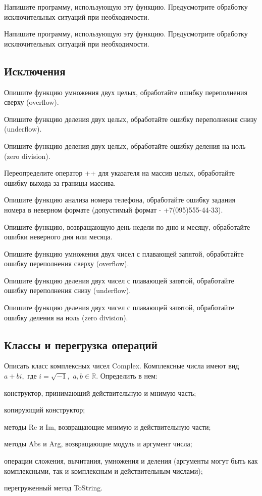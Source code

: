 \task %

Напишите программу, использующую эту функцию. Предусмотрите обработку
исключительных ситуаций при необходимости.

\task 

Напишите программу, использующую эту функцию. Предусмотрите обработку
исключительных ситуаций при необходимости.


\subsection{Исключения}

\task Опишите функцию умножения двух целых, обработайте ошибку переполнения сверху (overflow).

\task Опишите функцию деления двух целых, обработайте ошибку переполнения снизу (underflow).

\task Опишите функцию деления двух целых, обработайте ошибку деления на ноль (zero division).

\task Переопределите оператор ++ для указателя на массив целых, обработайте ошибку выхода за границы массива.

\task Опишите функцию анализа номера телефона, обработайте ошибку задания номера в неверном формате (допустимый формат - +7(095)555-44-33).

\task 

\task Опишите функцию, возвращающую день недели по дню и месяцу, обработайте ошибки неверного дня или месяца.

\task Опишите функцию умножения двух чисел с плавающей запятой, обработайте ошибку переполнения сверху (overflow).

\task Опишите функцию деления двух чисел с плавающей запятой, обработайте ошибку переполнения снизу (underflow).

\task Опишите функцию деления двух чисел с плавающей запятой, обработайте ошибку деления на ноль (zero division).


\subsection{Классы и перегрузка операций}

\task Описать класс комплексных чисел Complex. Комплексные числа имеют
вид $a+bi,$ где $i=\sqrt{-1},$ $a,b \in \mathbb{R}$. Определить в нем:
\begin{itemize*}
\item конструктор, принимающий действительную и мнимую часть;
\item копирующий конструктор;
\item методы Re и Im, возвращающие мнимую и действительную части;
\item методы Abs и Arg, возвращающие модуль и аргумент числа;
\item операции сложения, вычитания, умножения и деления (аргументы
  могут быть как комплексными, так и комплексным и действительным
  числами);
\item перегруженный метод ToString.
\end{itemize*}

